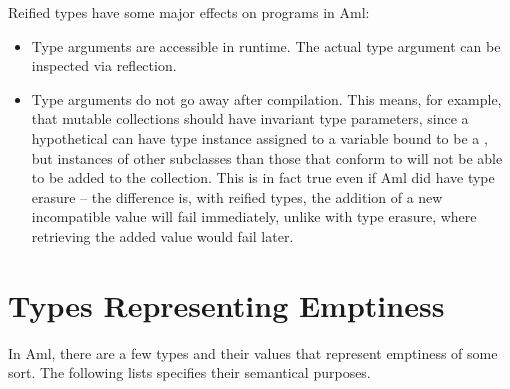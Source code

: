 Reified types have some major effects on programs in Aml:
\begin{itemize}

\item Type arguments are accessible in runtime. The actual type argument can be inspected via reflection. 

\item Type arguments do not go away after compilation. This means, for example, that mutable collections should have invariant type parameters, since a hypothetical  can have type instance  assigned to a variable bound to be a , but instances of other subclasses than those that conform to  will not be able to be added to the collection. This is in fact true even if Aml did have type erasure -- the difference is, with reified types, the addition of a new incompatible value will fail immediately, unlike with type erasure, where retrieving the added value would fail later. 
\end{itemize}





\section{Types Representing Emptiness}
\label{sec:emptiness}

In Aml, there are a few types and their values that represent emptiness of some sort. The following lists specifies their semantical purposes. 

